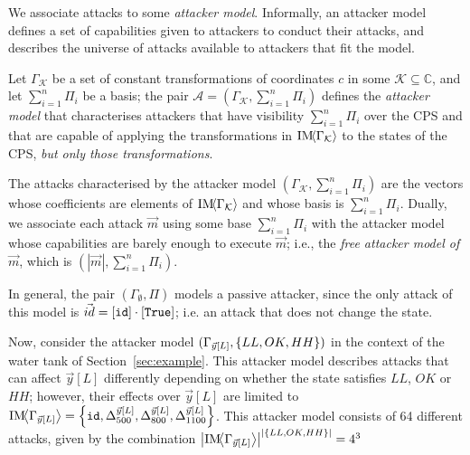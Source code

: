 {{We associate attacks to some \emph{attacker model}.
Informally, an attacker model defines a set of capabilities given to attackers to conduct their attacks, and describes the universe of attacks available to attackers that fit the model. 
\begin{definition}
 Let $\Gamma_\mathcal{K}$ be a set of constant transformations of coordinates $c$ in some $\mathcal{K}\subseteq\mathbb{C}$, and let $\sum_{i=1}^n\Pi_i$ be a basis; the pair $\mathcal{A}=(\Gamma_{\mathcal{K}}, \sum_{i=1}^n\Pi_i)$ defines the \emph{attacker model} that characterises attackers that have visibility $\sum_{i=1}^n\Pi_i$ over the CPS and that are capable of applying the transformations in $\text{IM}\!{{\left<\Gamma_\mathcal{K}\right>}}$ %
  to the states of the CPS, \emph{but only those transformations}. %
  
  The attacks characterised by the attacker model $(\Gamma_{\mathcal{K}}, \sum_{i=1}^n\Pi_i)$ are the vectors whose coefficients are elements of $\text{IM}\!{{\left<\Gamma_\mathcal{K}\right>}}$ and whose basis is $\sum_{i=1}^n\Pi_i$. Dually, we associate each attack $\vec{m}$ using some base $\sum_{i=1}^n\Pi_i$ with the attacker model whose capabilities are barely enough to execute $\vec{m}$; i.e., the \emph{free attacker model of $\vec{m}$}, which is $(|\vec{m}|, \sum_{i=1}^n\Pi_i)$.
\end{definition}
\begin{example}
  In general, the pair $(\Gamma_{\emptyset}, \Pi)$ models a passive attacker, since the only attack of this model is $\vec{id}=[{\texttt{id}}]\cdot[\texttt{True}]$; i.e. an attack that does not change the state. %

  Now, consider the attacker model $(\Gamma_{\vec{y}[L]},\left\{LL,OK,HH\right\})$ in the context of the water tank of Section~\ref{sec:example}. This attacker model describes attacks that can affect $\vec{y}[L]$ differently depending on whether the state satisfies $LL$, $OK$ or $HH$; 
  however, their effects over $\vec{y}[L]$ are limited to $\text{IM}\!{{\left<\Gamma_{\vec{y}[L]}\right>}}=\left\{{\texttt{id}}, {\Delta}^{\vec{y}[L]}_{500}, {\Delta}^{\vec{y}[L]}_{800}, {\Delta}^{\vec{y}[L]}_{1100}\right\}$. This attacker model consists of 64 different attacks, given by the combination ${\left|\text{IM}\!{{\left<\Gamma_{\vec{y}[L]}\right>}}\right|}^{\left|\left\{LL,OK,HH\right\}\right|}=4^3$
\end{example}

}}
